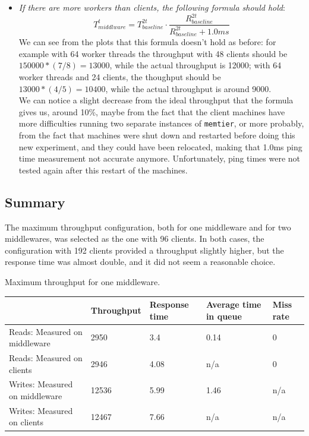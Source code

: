 \documentclass[11pt,a4paper]{article}
\renewcommand{\t}[1]{%
	{\texttt{#1}}}
\begin{document}
\begin{itemize}
	\item
		\emph{If there are more workers than clients, the following formula should hold}: 
		$$
			T_{middlware}^t = T_{baseline}^{2t} \cdot \frac{R_{baseline}^{2t}}{R_{baseline}^{2t} + 1.0ms}
		$$
		We can see from the plots that this formula doesn't hold as before: for
		example with 64 worker threads the throughput with 48 clients should be
		$150000*(7/8)=13000$, while the actual throughput is 12000; with 64
		worker threads and 24 clients, the thoughput should be $13000 *
		(4/5)=10400$, while the actual throughput is around 9000.\\ We can notice
		a slight decrease from the ideal throughput that the formula gives us,
		around 10\%, maybe from the fact that the client machines have more
		difficulties running two separate instances of \t{memtier}, or more
		probably, from the fact that machines were shut down and restarted
		before doing this new experiment, and they could have been relocated,
		making that 1.0ms ping time measurement not accurate anymore.
		Unfortunately, ping times were not tested again after this restart of
		the machines.
		
\end{itemize}


\subsection{Summary}

The maximum throughput configuration, both for one middleware and for two middlewares, was selected as the one with
96 clients. In both cases, the configuration with 192 clients provided a throughput slightly higher, but the response
time was almost double, and it did not seem a reasonable choice.

\begin{center}
	{Maximum throughput for one middleware.}
	\begin{tabular}{|l|p{2cm}|p{2cm}|p{2cm}|p{2cm}|}
		\hline                                & Throughput & Response time & Average time in queue & Miss rate \\ 
		\hline Reads: Measured on middleware  & 2950       & 3.4           & 0.14                  & 0          \\ 
		\hline Reads: Measured on clients     & 2946       & 4.08          & n/a                   & 0          \\ 
		\hline Writes: Measured on middleware & 12536      & 5.99          & 1.46                  & n/a       \\ 
		\hline Writes: Measured on clients    & 12467      & 7.66          & n/a                   & n/a       \\ 
		\hline 
	\end{tabular}
\end{center}
\end{document}
